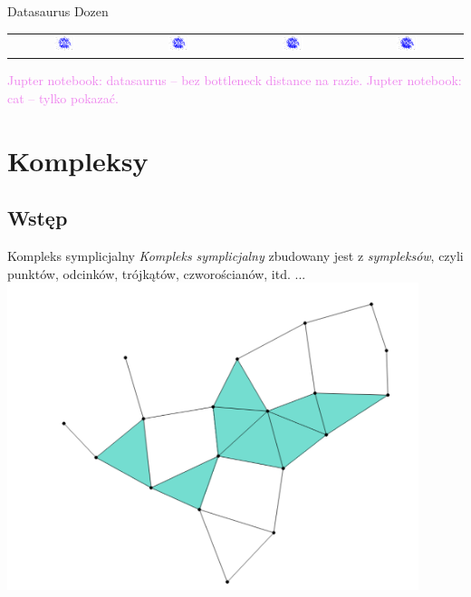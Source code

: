 \documentclass{beamer}
\newcommand{\comment}[1]{\textcolor{violet}{#1}}
\begin{document}
\begin{frame}{Datasaurus Dozen}
\begin{center}
\begin{tabular}{cccc}
      \includegraphics[width=0.20\textwidth]{images/datasaurus-8.png} &
      \includegraphics[width=0.20\textwidth]{images/datasaurus-9.png} &
      \includegraphics[width=0.20\textwidth]{images/datasaurus-10.png} &
      \includegraphics[width=0.20\textwidth]{images/datasaurus-11.png} \\
    \end{tabular}
  \end{center}
  \pause
  \comment{Jupter notebook: datasaurus -- bez bottleneck distance na razie.}
  \pause
  \comment{Jupter notebook: cat -- tylko pokazać.}
\end{frame}

\section{Kompleksy}
\subsection{Wstęp}
\begin{frame}{Kompleks symplicjalny}
  \emph{Kompleks symplicjalny} zbudowany jest z \emph{sympleksów},
    czyli punktów, odcinków, trójkątów, czworościanów, itd. ...
    \includegraphics[width=0.9\textwidth]{images/simplicial-complex.png}
\end{frame}
\end{document}
